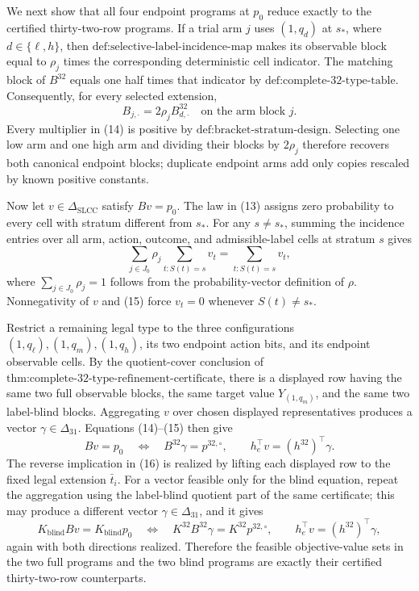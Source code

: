 We next show that all four endpoint programs at \(p_0\) reduce exactly to the certified thirty-two-row programs.  If a trial arm \(j\) uses \((1,q_d)\) at \(s_*\), where \(d\in\{\ell,h\}\), then \(\text{def:selective-label-incidence-map}\) makes its observable block equal to \(\rho_j\) times the corresponding deterministic cell indicator.  The matching block of \(B^{32}\) equals one half times that indicator by \(\text{def:complete-32-type-table}\).  Consequently, for every selected extension,
\[
 B_{j,\cdot}=2\rho_j B^{32}_{d,\cdot}
 \quad\text{on the arm block }j.
\tag{14}
\]
Every multiplier in (14) is positive by \(\text{def:bracket-stratum-design}\).  Selecting one low arm and one high arm and dividing their blocks by \(2\rho_j\) therefore recovers both canonical endpoint blocks; duplicate endpoint arms add only copies rescaled by known positive constants.

Now let \(v\in\Delta_{\mathrm{SLCC}}\) satisfy \(Bv=p_0\).  The law in (13) assigns zero probability to every cell with stratum different from \(s_*\).  For any \(s\neq s_*\), summing the incidence entries over all arm, action, outcome, and admissible-label cells at stratum \(s\) gives
\[
 \sum_{j\in J_0}\rho_j\sum_{t:S(t)=s}v_t
 =\sum_{t:S(t)=s}v_t,
\tag{15}
\]
where \(\sum_{j\in J_0}\rho_j=1\) follows from the probability-vector definition of \(\rho\).  Nonnegativity of \(v\) and (15) force \(v_t=0\) whenever \(S(t)\neq s_*\).

Restrict a remaining legal type to the three configurations \((1,q_\ell),(1,q_m),(1,q_h)\), its two endpoint action bits, and its endpoint observable cells.  By the quotient-cover conclusion of \(\text{thm:complete-32-type-refinement-certificate}\), there is a displayed row having the same two full observable blocks, the same target value \(Y_{(1,q_m)}\), and the same two label-blind blocks.  Aggregating \(v\) over chosen displayed representatives produces a vector \(\gamma\in\Delta_{31}\).  Equations (14)--(15) then give
\[
 Bv=p_0
 \quad\Longleftrightarrow\quad
 B^{32}\gamma=p^{32,\circ},
 \qquad
 h_e^{\top}v=(h^{32})^{\top}\gamma.
\tag{16}
\]
The reverse implication in (16) is realized by lifting each displayed row to the fixed legal extension \(\bar t_i\).  For a vector feasible only for the blind equation, repeat the aggregation using the label-blind quotient part of the same certificate; this may produce a different vector \(\gamma\in\Delta_{31}\), and it gives
\[
 K_{\mathrm{blind}}Bv=K_{\mathrm{blind}}p_0
 \quad\Longleftrightarrow\quad
 K^{32}B^{32}\gamma=K^{32}p^{32,\circ},
 \qquad
 h_e^{\top}v=(h^{32})^{\top}\gamma,
\tag{17}
\]
again with both directions realized.  Therefore the feasible objective-value sets in the two full programs and the two blind programs are exactly their certified thirty-two-row counterparts.

